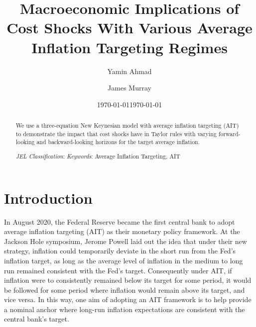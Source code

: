 \documentclass[english,authoryear,12pt]{elsarticle}
\begin{document}
	\begin{frontmatter}
		\title{Macroeconomic Implications of Cost Shocks With Various Average Inflation Targeting Regimes}
		\date{\today}
		\author[1]{Yamin Ahmad}
		\author[2]{James Murray}
		
		\address[1]{Dept. of Economics, University of Wisconsin - Whitewater, 809 W. Starin Road, Whitewater, WI 53190, USA}
		\address[2]{Dept. of Economics, University of Wisconsin - La Crosse, 1725 State St., La Crosse, WI 53190, USA}		
	
	\date{\today}
	
	\begin{abstract}
		We use a three-equation New Keynesian model with average inflation targeting (AIT) to demonstrate the impact that cost shocks have in Taylor rules with varying forward-looking and backward-looking horizons for the target average inflation.
		
		\begin{flushleft}
			{\it JEL Classification}:  \newline
			{\it Keywords}: Average Inflation Targeting, AIT
		\end{flushleft}
	\end{abstract}
	
\end{frontmatter}

\renewcommand{\thefootnote}{\arabic{footnote}}%
\setcounter{page}{1}%
\setcounter{footnote}{0}%


\section{\label{Intro}Introduction}
In August 2020, the Federal Reserve became the first central bank to adopt average inflation targeting (AIT) as their monetary policy framework. At the Jackson Hole symposium, Jerome Powell laid out the idea that under their new strategy, inflation could temporarily deviate in the short run from the Fed's inflation target, as long as the average level of inflation in the medium to long run remained consistent with the Fed's target. Consequently under AIT, if inflation were to consistently remained below its target for some period, it would be followed for some period where inflation would remain above its target, and vice versa. In this way, one aim of adopting an AIT framework is to help provide a nominal anchor where long-run inflation expectations are consistent with the central bank's target. 
\end{document}

